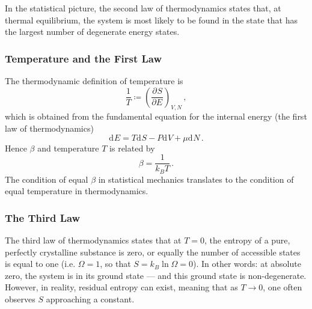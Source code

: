 \documentclass{article}
\theoremstyle{plain}\theoremheaderfont{\normalfont\bfseries}\theorembodyfont{\rmfamily}\theoremseparator{.}\newtheorem*{thm}{Theorem}\newtheorem*{law}{Law}\newtheorem*{pos}{Postulate}
\numberwithin{equation}{section}
\renewcommand{\d}[2][]{\mathrm{d}^{#1} #2}
\newcommand{\pdv}[3][]{\frac{\partial^{#1} #2}{{\partial #3}^{#1}}}
\begin{document}
    In the statistical picture, the second law of thermodynamics states that, at thermal equilibrium, the system is most likely to be found in the state that has the largest number of degenerate energy states.

    \subsubsection{Temperature and the First Law}
    The thermodynamic definition of temperature is
    \begin{equation}
        \frac{1}{T}\coloneqq\left(\pdv{S}{E}\right)_{V,N}\,,
    \end{equation}
    which is obtained from the fundamental equation for the internal energy (the first law of thermodynamics)
    \begin{equation}
        \d{E}=T\d{S}-P\d{V}+\mu\d{N}\,.
    \end{equation}
    Hence \(\beta\) and temperature \(T\) is related by
    \begin{equation}
        \beta=\frac{1}{k_B T}\,.
    \end{equation}
    The condition of equal \(\beta\) in statistical mechanics translates to the condition of equal temperature in thermodynamics. 

    \subsubsection{The Third Law}
    The third law of thermodynamics states that at \(T=0\), the entropy of a pure, perfectly crystalline substance is zero, or equally the number of accessible states is equal to one (i.e. \(\Omega=1\), so that \(S=k_B\ln\Omega=0\)). In other words: at absolute zero, the system is in its ground state --- and this ground state is non-degenerate. However, in reality, residual entropy can exist, meaning that as \(T\to 0\), one often observes \(S\) approaching a constant.
\end{document}
